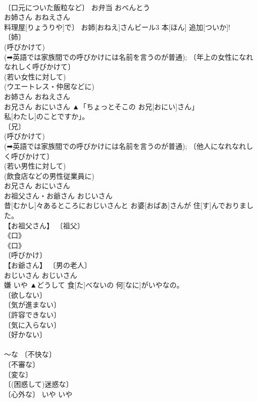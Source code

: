 \documentclass[8pt]{extreport}
\begin{document}
\begin{CJK}{UTF8}{min}
\\	〔口元についた飯粒など〕	お弁当	おべんとう	
\\	お姉さん	おねえさん	
\\	料理屋[りょうりや]で〕 お姉[おねえ]さんビール3 本[ほん] 追加[ついか]!	
\\	〔姉〕 
\\	(呼びかけて) 
\\	(➡英語では家族間での呼びかけには名前を言うのが普通); 〔年上の女性になれなれしく呼びかけて〕 
\\	(若い女性に対して) 
\\	(ウエートレス・仲居などに) 
\\	お姉さん	おねえさん	
\\	お兄さん	おにいさん	▲「ちょっとそこの お兄[おにい]さん」
\\	私[わたし]のことですか」。	
\\	〔兄〕 
\\	(呼びかけて) 
\\	(➡英語では家族間での呼びかけには名前を言うのが普通); 〔他人になれなれしく呼びかけて〕 
\\	(若い男性に対して) 
\\	(飲食店などの男性従業員に) 
\\	お兄さん	おにいさん	
\\	お祖父さん・お爺さん	おじいさん	
\\	昔[むかし]々あるところにおじいさんと お婆[おばあ]さんが 住[す]んでおりました。	
\\	【お祖父さん】 〔祖父〕 
\\	《口》 
\\	《口》 
\\	〔呼びかけ〕 
\\	【お爺さん】 〔男の老人〕 
\\	おじいさん	おじいさん	
\\	嫌	いや	▲どうして 食[た]べないの 何[なに]がいやなの。	
\\	〔欲しない〕 
\\	〔気が進まない〕 
\\	〔許容できない〕 
\\	〔気に入らない〕 
\\	〔好かない〕 
\\	[⇒いやでも, いやに] 
\\	～な 〔不快な〕 
\\	〔不審な〕 
\\	〔変な〕 
\\	〔(困惑して)迷惑な〕 
\\	〔心外な〕	いや	いや	

\end{CJK}
\end{document}
